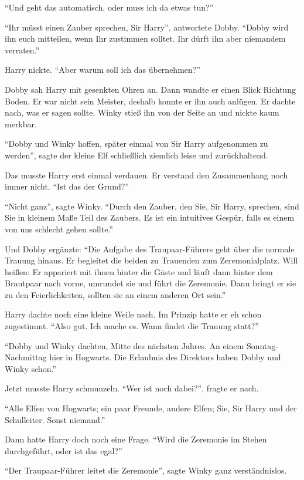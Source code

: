 \enquote{Und geht das automatisch, oder muss ich da etwas tun?}

\enquote{Ihr müsst einen Zauber sprechen, Sir Harry}, antwortete Dobby. \enquote{Dobby wird ihn euch mitteilen, wenn Ihr zustimmen solltet. Ihr dürft ihn aber niemandem verraten.}

Harry nickte. \enquote{Aber warum soll ich das übernehmen?}

Dobby sah Harry mit gesenkten Ohren an. Dann wandte er einen Blick Richtung Boden. Er war nicht sein Meister, deshalb konnte er ihn auch anlügen. Er dachte nach, was er sagen sollte. Winky stieß ihn von der Seite an und nickte kaum merkbar.

\enquote{Dobby und Winky hoffen, später einmal von Sir Harry aufgenommen zu werden}, sagte der kleine Elf schließlich ziemlich leise und zurückhaltend.

Das musste Harry erst einmal verdauen. Er verstand den Zusammenhang noch immer nicht. \enquote{Ist das der Grund?}

\enquote{Nicht ganz}, sagte Winky. \enquote{Durch den Zauber, den Sie, Sir Harry, sprechen, sind Sie in kleinem Maße Teil des Zaubers. Es ist ein intuitives Gespür, falls es einem von uns schlecht gehen sollte.}

Und Dobby ergänzte: \enquote{Die Aufgabe des Traupaar-Führers geht über die normale Trauung hinaus. Er begleitet die beiden zu Trauenden zum Zeremonialplatz. Will heißen: Er appariert mit ihnen hinter die Gäste und läuft dann hinter dem Brautpaar nach vorne, umrundet sie und führt die Zeremonie. Dann bringt er sie zu den Feierlichkeiten, sollten sie an einem anderen Ort sein.}

Harry dachte noch eine kleine Weile nach. Im Prinzip hatte er eh schon zugestimmt. \enquote{Also gut. Ich mache es. Wann findet die Trauung statt?}

\enquote{Dobby und Winky dachten, Mitte des nächsten Jahres. An einem Sonntag-Nachmittag hier in Hogwarts. Die Erlaubnis des Direktors haben Dobby und Winky schon.}

Jetzt musste Harry schmunzeln. \enquote{Wer ist noch dabei?}, fragte er nach.

\enquote{Alle Elfen von Hogwarts; ein paar Freunde, andere Elfen; Sie, Sir Harry und der Schulleiter. Sonst niemand.}

Dann hatte Harry doch noch eine Frage. \enquote{Wird die Zeremonie im Stehen durchgeführt, oder ist das egal?}

\enquote{Der Traupaar-Führer leitet die Zeremonie}, sagte Winky ganz verständnislos.


